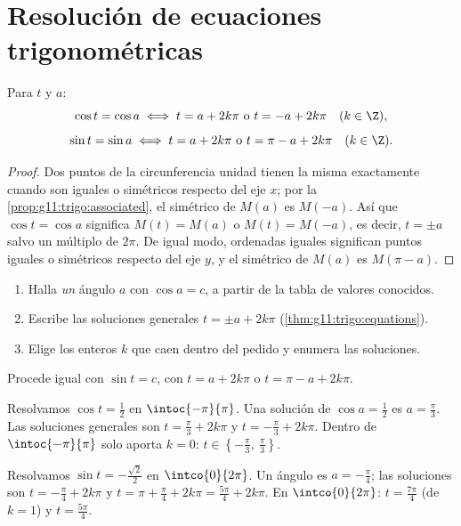 \section{Resolución de ecuaciones trigonométricas}

\begin{theorem}[Las ecuaciones $\cos t = \cos a$ y $\sin t = \sin a$]
\label{thm:g11:trigo:equations}
Para  $t$ y $a$:
\[
\cos t = \cos a \iff t = a + 2k\pi \ \text{o}\ t = -a + 2k\pi
\quad (k \in \Z),
\]
\[
\sin t = \sin a \iff t = a + 2k\pi \ \text{o}\ t = \pi - a + 2k\pi
\quad (k \in \Z).
\]
\end{theorem}

\begin{proof}
Dos puntos de la circunferencia unidad tienen la misma  exactamente
cuando son iguales o simétricos respecto del eje $x$; por la
\cref{prop:g11:trigo:associated}, el simétrico de $M(a)$ es $M(-a)$. Así
que $\cos t = \cos a$ significa $M(t) = M(a)$ o $M(t) = M(-a)$, es decir,
$t = \pm a$ salvo un múltiplo de $2\pi$. De igual modo, ordenadas iguales
significan puntos iguales o simétricos respecto del eje $y$, y el
simétrico de $M(a)$ es $M(\pi - a)$.
\end{proof}

\begin{method}[Resolver $\cos t = c$ en un intervalo]\label{met:g11:trigo:solve}
\begin{enumerate}
  \item Halla \emph{un} ángulo $a$ con $\cos a = c$, a partir de la tabla
        de valores conocidos.
  \item Escribe las soluciones generales $t = \pm a + 2k\pi$
        (\cref{thm:g11:trigo:equations}).
  \item Elige los enteros $k$ que caen dentro del  pedido y
        enumera las soluciones.
\end{enumerate}
Procede igual con $\sin t = c$, con $t = a + 2k\pi$ o
$t = \pi - a + 2k\pi$.
\end{method}

\begin{example}\label{ex:g11:trigo:solve}
Resolvamos $\cos t = \frac12$ en $\intoc{-\pi}{\pi}$. Una solución de
$\cos a = \frac12$ es $a = \frac{\pi}{3}$. Las soluciones generales son
$t = \frac\pi3 + 2k\pi$ y $t = -\frac\pi3 + 2k\pi$. Dentro de
$\intoc{-\pi}{\pi}$ solo aporta $k = 0$:
$t \in \left\{-\frac\pi3,\ \frac\pi3\right\}$.

Resolvamos $\sin t = -\frac{\sqrt2}{2}$ en $\intco{0}{2\pi}$. Un ángulo es
$a = -\frac\pi4$; las soluciones son $t = -\frac\pi4 + 2k\pi$ y
$t = \pi + \frac\pi4 + 2k\pi = \frac{5\pi}{4} + 2k\pi$. En
$\intco{0}{2\pi}$: $t = \frac{7\pi}{4}$ (de $k = 1$) y
$t = \frac{5\pi}{4}$.
\end{example}

